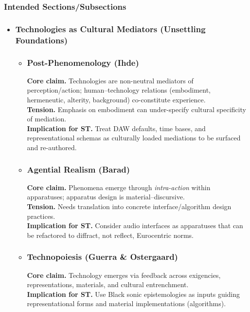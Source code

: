 \subsubsection{Intended Sections/Subsections}
\begin{itemize}[nosep]
	\item \subsubsection{Technologies as Cultural Mediators (Unsettling Foundations)}
	\begin{itemize}[nosep]
		\item \subsubsection{Post-Phenomenology (Ihde)}
			\textbf{Core claim.} Technologies are non-neutral mediators of perception/action; human–technology relations (embodiment, hermeneutic, alterity, background) co-constitute experience. \\
			\textbf{Tension.} Emphasis on embodiment can under-specify cultural specificity of mediation. \\
			\textbf{Implication for ST.} Treat DAW defaults, time bases, and representational schemas as culturally loaded mediations to be surfaced and re-authored.
		\item \subsubsection{Agential Realism (Barad)}
			\textbf{Core claim.} Phenomena emerge through \textit{intra-action} within apparatuses; apparatus design is material–discursive. \\
			\textbf{Tension.} Needs translation into concrete interface/algorithm design practices. \\
			\textbf{Implication for ST.} Consider audio interfaces as apparatuses that can be refactored to diffract, not reflect, Eurocentric norms.
		\item \subsubsection{Technopoiesis (Guerra \& Ostergaard)}
			\textbf{Core claim.} Technology emerges via feedback across exigencies, representations, materials, and cultural entrenchment. \\
			\textbf{Implication for ST.} Use Black sonic epistemologies as inputs guiding representational forms and material implementations (algorithms).

\end{itemize}
\end{itemize}
